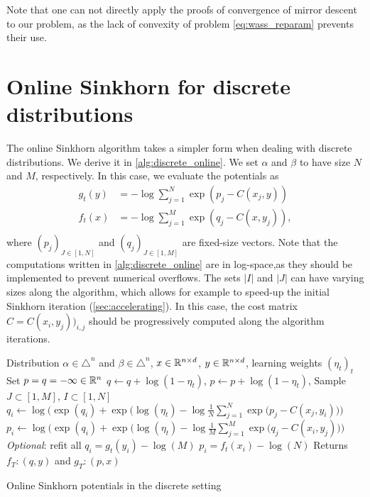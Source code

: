 Note that one can not directly apply the proofs of convergence of mirror descent to our problem, as the lack of convexity of problem \eqref{eq:wass_reparam} prevents their use.


\section{Online Sinkhorn for discrete distributions}\label{sec:sinkhorn_discrete}

The online Sinkhorn algorithm takes a simpler form when dealing with discrete
distributions. We derive it in \autoref{alg:discrete_online}. We set $\alpha$
and $\beta$ to have size $N$ and $M$, respectively. In this case, we evaluate
the potentials as
\begin{align}
    g_t(y) &= - \log \sum_{j=1}^N \exp(p_j - C(x_j, y)) \\
    f_t(x) &= - \log \sum_{j=1}^M \exp(q_j - C(x, y_j)), \\
\end{align}
where $(p_j)_{J \in [1, N]}$ and $(q_j)_{J \in [1, M]}$ are fixed-size vectors.
Note that the computations written in \autoref{alg:discrete_online} are
in log-space,as they should be implemented to prevent numerical overflows. The sets $|I|$ and $|J|$ can
have varying sizes along the algorithm, which allows for example to speed-up the
initial Sinkhorn iteration (\autoref{sec:accelerating}). In this case, the
cost matrix $\hat C = C(x_i,y_j))_{i,j}$ should be progressively computed along the algorithm iterations.

\begin{algorithm}[t]
    \begin{algorithmic}
    \Input Distribution $\alpha \in \triangle^n$ and 
    $\beta \in \triangle^n$, $x \in \mathbb{R}^{n \times d}$, 
    $y \in \mathbb{R}^{n \times d}$, learning weights ${(\eta_t)}_t$
    \State Set $p = q = - \infty \in \mathbb{R}^n$
        \State $q \gets q + \log(1 - \eta_t)$, $p \gets p + \log(1 - \eta_t)$,
        \State Sample $J \subset [1, M]$, 
        $I \subset [1, N]$
            \State $q_i \gets \log \Big( \exp(q_i)
            + \exp\big(\log(\eta_t) - \log \frac{1}{N} 
            \sum_{j=1}^{N} \exp(p_j - C(x_j, y_i)\big) \Big) $
        \EndFor
        \State $p_i \gets \log \Big( \exp(q_i)
        + \exp \big( \log(\eta_t) - \log \frac{1}{M} 
        \sum_{j=1}^{M} \exp(q_j - C(x_i, y_j)\big) \Big)$
        \EndFor
        \State \textit{Optional}: refit all $q_i = g_t(y_i) - \log (M)$
        \State\hspace{2.45cm} $p_i = f_t(x_i) - \log (N)$
    \EndFor
    \State Returns $f_T : (q, y)$ and
    $g_T : (p, x)$
    \end{algorithmic}
    \caption{Online Sinkhorn potentials in the discrete setting}\label{alg:discrete_online}
\end{algorithm}




